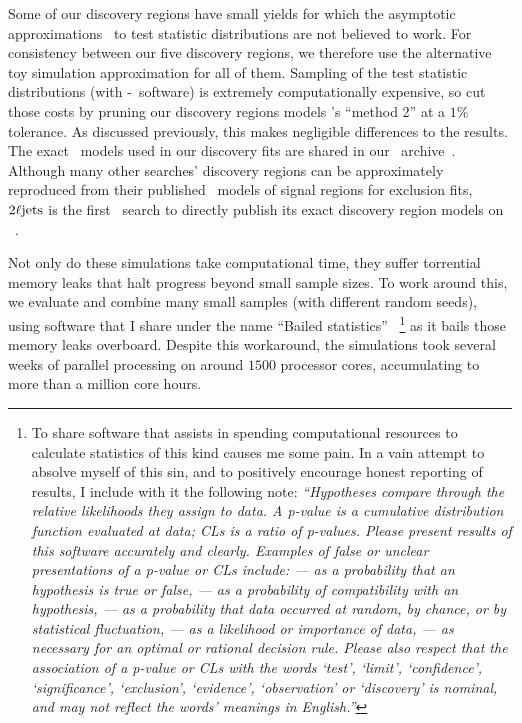 Some of our discovery regions have small yields for which the asymptotic
approximations~\cite{Cowan:2010js} to test statistic distributions are not
believed to work.
For consistency between our five discovery regions, we therefore use the
alternative toy simulation approximation for all of them.
Sampling of the test statistic distributions
(with \histfitter-\roofit\ software)
is extremely computationally expensive, so cut those costs by pruning our
discovery regions models \histfitter's ``method 2'' at a $1\%$ tolerance.
As discussed previously, this makes negligible differences to the results.
The exact \histfactory\ models used in our discovery fits are shared in our
\hepdata\ archive~\cite{hepdata.116034}.
Although many other searches' discovery regions can be approximately reproduced
from their published \pyhf\ models of signal regions for exclusion fits,
$2\ell\mathrm{jets}$ is the first \atlas\ search to directly publish its exact discovery
region models on \hepdata~\cite{
SUSY-2019-08,
hepdata.90607,
SUSY-2018-10,
hepdata.97041,
SUSY-2018-04,
hepdata.92006,
SUSY-2018-32,
hepdata.89413,
atlas2022searches,
hepdata.116034,
atlas_rjr_3l_SUSY_2019_09,
hepdata.95751,
SUSY-2018-36,
hepdata.99806,
atlas_rjr_mimic_SUSY_2018_06,
hepdata.91127,
SUSY-2018-09,
hepdata.91214,
SUSY-2018-02,
hepdata.103062,
atlas_susy_compressed_2l_2018_run2,
hepdata.91374,
SUSY-2018-33,
hepdata.91760,
SUSY-2018-31,
hepdata.89408,
atlas_susy_strong_0l,
hepdata.95664
}.

Not only do these simulations take computational time, they suffer
torrential memory leaks that halt progress beyond small sample sizes.
To work around this, we evaluate and combine many small samples (with different
random seeds), using software that I share under the name
``Bailed statistics''~\cite{bailedstatisticsgithub}%
\footnote{%
To share software that assists in spending computational resources to
calculate statistics of this kind causes me some pain.
In a vain attempt to absolve myself of this sin, and to positively encourage
honest reporting of results, I include with it the following note:
\emph{%
``Hypotheses compare through the relative likelihoods they assign to data.
A p-value is a cumulative distribution function evaluated at data; CLs is a
ratio of p-values.
Please present results of this software accurately and clearly.
Examples of false or unclear presentations of a p-value or CLs include:
--- as a probability that an hypothesis is true or false,
--- as a probability of compatibility with an hypothesis,
--- as a probability that data occurred at random, by chance, or by statistical fluctuation,
--- as a likelihood or importance of data,
--- as necessary for an optimal or rational decision rule.
Please also respect that the association of a p-value or CLs with the words
`test', `limit', `confidence', `significance', `exclusion', `evidence',
`observation' or `discovery' is nominal,
and may not reflect the words' meanings in English.''
}%
}
as it bails those memory leaks overboard.
Despite this workaround, the simulations took several weeks of parallel
processing on around $1500$ processor cores, accumulating to more than a
million core hours.

